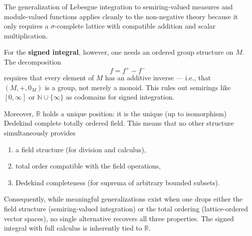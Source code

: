 \begin{remark} \label{remark:signed_integral_requires_ordered_group}
The generalization of Lebesgue integration to semiring-valued measures and module-valued functions applies cleanly to the non-negative theory because it only requires a $\sigma$-complete lattice with compatible addition and scalar multiplication.

For the \textbf{signed integral}, however, one needs an ordered group structure on $M$. The decomposition
$$f = f^+ - f^-$$
requires that every element of $M$ has an additive inverse — i.e., that $(M,+,0_M)$ is a group, not merely a monoid. This rules out semirings like $[0,\infty]$ or $\mathbb{N} \cup \{\infty\}$ as codomains for signed integration.

Moreover, $\mathbb{R}$ holds a unique position: it is the unique (up to isomorphism) Dedekind complete totally ordered field. This means that no other structure simultaneously provides
\begin{enumerate}
    \item a field structure (for division and calculus),
    \item total order compatible with the field operations,
    \item Dedekind completeness (for suprema of arbitrary bounded subsets).
\end{enumerate}

Consequently, while meaningful generalizations exist when one drops either the field structure (semiring-valued integration) or the total ordering (lattice-ordered vector spaces), no single alternative recovers all three properties. The signed integral with full calculus is inherently tied to $\mathbb{R}$.

\end{remark}
